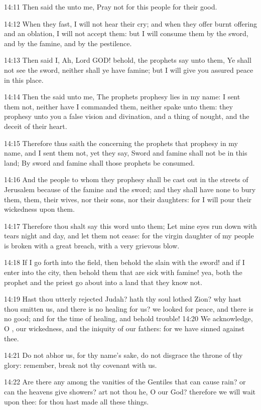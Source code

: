14:11 Then said the \LORD unto me, Pray not for this people for their
good.

14:12 When they fast, I will not hear their cry; and when they offer
burnt offering and an oblation, I will not accept them: but I will
consume them by the sword, and by the famine, and by the pestilence.

14:13 Then said I, Ah, Lord GOD! behold, the prophets say unto them,
Ye shall not see the sword, neither shall ye have famine; but I will
give you assured peace in this place.

14:14 Then the \LORD said unto me, The prophets prophesy lies in my
name: I sent them not, neither have I commanded them, neither spake
unto them: they prophesy unto you a false vision and divination, and a
thing of nought, and the deceit of their heart.

14:15 Therefore thus saith the \LORD concerning the prophets that
prophesy in my name, and I sent them not, yet they say, Sword and
famine shall not be in this land; By sword and famine shall those
prophets be consumed.

14:16 And the people to whom they prophesy shall be cast out in the
streets of Jerusalem because of the famine and the sword; and they
shall have none to bury them, them, their wives, nor their sons, nor
their daughters: for I will pour their wickedness upon them.

14:17 Therefore thou shalt say this word unto them; Let mine eyes run
down with tears night and day, and let them not cease: for the virgin
daughter of my people is broken with a great breach, with a very
grievous blow.

14:18 If I go forth into the field, then behold the slain with the
sword!  and if I enter into the city, then behold them that are sick
with famine!  yea, both the prophet and the priest go about into a
land that they know not.

14:19 Hast thou utterly rejected Judah? hath thy soul lothed Zion? why
hast thou smitten us, and there is no healing for us? we looked for
peace, and there is no good; and for the time of healing, and behold
trouble!  14:20 We acknowledge, O \LORD, our wickedness, and the
iniquity of our fathers: for we have sinned against thee.

14:21 Do not abhor us, for thy name's sake, do not disgrace the throne
of thy glory: remember, break not thy covenant with us.

14:22 Are there any among the vanities of the Gentiles that can cause
rain? or can the heavens give showers? art not thou he, O \LORD our
God?  therefore we will wait upon thee: for thou hast made all these
things.

